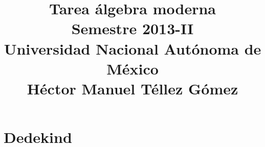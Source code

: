 \documentclass[a5paper,oneside]{amsart}
\title[Tarea álgebra moderna]{Tarea álgebra moderna\\ Semestre 2013-II\\ Universidad Nacional Autónoma de México\\ Héctor Manuel Téllez Gómez}
\theoremstyle{dotless}
\begin{document}
	\maketitle
    
        
    \section*{Dedekind}
                
\end{document}
